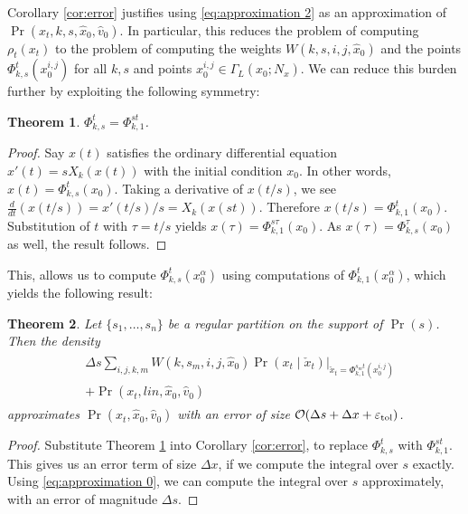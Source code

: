 \documentclass[letterpaper,10pt,conference]{ieeeconf}
\newtheorem{thm}{Theorem}
\begin{document}
Corollary \ref{cor:error} justifies using \eqref{eq:approximation 2} as an approximation of $\Pr( x_t, k,s,\hat{x}_0, \hat{v}_0)$.
In particular, this reduces the problem of computing $\rho_t(x_t)$ to the problem of computing the weights $W(k,s,i,j,\hat{x}_0)$ and the points $\Phi_{k,s}^t(x_0^{i,j})$ for all $k,s$ and points $x_0^{i,j} \in \Gamma_L( \hat{x}_0; N_x)$.
We can reduce this burden further by exploiting the following symmetry:
\begin{thm} \label{thm:symmetry}
	$\Phi_{k,s}^t = \Phi_{k,1}^{st}$.
\end{thm}
\begin{proof}
	Say $x(t)$ satisfies the ordinary differential equation $x'(t) = sX_k(x(t))$ with the initial condition $x_0$.
	In other words, $x(t) = \Phi_{k,s}^{t}(x_0)$.
	Taking a derivative of $x(t/s)$, we see $\frac{d}{dt} (x(t/s)) = x'(t/s) /s = X_k(x(st))$.
	Therefore $x(t/s) = \Phi_{k,1}^{t}( x_0)$.
	Substitution of $t$ with $\tau = t/s$ yields $x(\tau) = \Phi_{k,1}^{s \tau} (x_0)$.
	As $x(\tau) = \Phi_{k,s}^{\tau}(x_0)$ as well, the result follows.
\end{proof}
This, allows us to compute $\Phi_{k,s}^t( x_0^{\alpha})$ using computations of $\Phi_{k,1}^t(x_0^{\alpha})$, which yields the following result:
\begin{thm} \label{thm:main}
	Let $\{s_1,\dots,s_n\}$ be a regular partition on the support of $\Pr(s)$.
	Then the density
	\begin{align}
		\begin{split}
		&\Delta s \sum_{i,j,k,m} W(k,s_m,i,j,\hat{x}_0) \left. \Pr( x_t \mid \check{x}_t ) \right|_{ \check{x}_t = \Phi_{k,1}^{s_m t}( x_0^{i,j}) } \\
		&+\Pr( x_t , lin, \hat{x}_0, \hat{v}_0 )
		\end{split}
		\label{eq:approximation 3}
	\end{align}
	approximates $\Pr( x_t, \hat{x}_0, \hat{v}_0)$ with an error of size $\mathcal{O}( \Delta s + \Delta x + \varepsilon_{\rm tol})$.
\end{thm}
\begin{proof}
	Substitute Theorem \ref{thm:symmetry} into Corollary \ref{cor:error}, to replace $\Phi_{k,s}^t$ with $\Phi_{k,1}^{st}$.
	This gives us an error term of size $\Delta x$, if we compute the integral over $s$ exactly.
	Using \eqref{eq:approximation 0}, we can compute the integral over $s$ approximately, with an error of magnitude $\Delta s$.
\end{proof}
\end{document}
